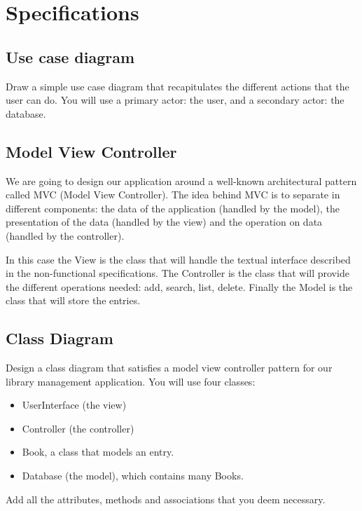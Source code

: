 \documentclass{exercices}
\renewcommand{\|}{\url|}
\begin{document}
\section{Specifications}

\subsection{Use case diagram}
\begin{exercice}
Draw a simple use case diagram that recapitulates the different actions that the user can do. 
You will use a primary actor: the user, and a secondary actor: the database.
\end{exercice}

\subsection{Model View Controller}

We are going to design our application around a well-known architectural pattern called MVC
(Model View Controller). The idea behind MVC is to separate in different components: 
the data of the application (handled by the model), the presentation of the data (handled by the view) 
and the operation on data (handled by the controller).

In this case the View is the class that will handle the textual interface described in the non-functional
specifications. The Controller is the class that will provide the different operations needed: add, search, list, delete.
Finally the Model is the class that will store the entries.

\subsection{Class Diagram}
\begin{exercice}
Design a class diagram that satisfies a model view controller pattern for our library management application.
You will use four classes:
\begin{itemize}
  \item UserInterface (the view)
  \item Controller (the controller)
  \item Book, a class that models an entry.
  \item Database (the model), which contains many Books.
\end{itemize}

Add all the attributes, methods and associations that you deem necessary.
\end{exercice}
\end{document}
